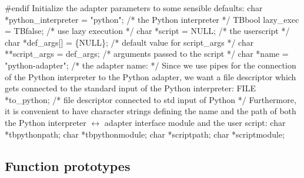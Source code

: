 #endif
\nwendcode{}\nwdocspar
Initialize the adapter parameters to some sensible defaults:
\nwenddocs{}\plusendmoddef\let\nwnotused=\nwoutput{}\nwstartdeflinemarkup{}\nwenddeflinemarkup
char *python_interpreter = "python";    /* the Python interpreter */
TBbool lazy_exec = TBfalse;             /* use lazy execution */
char *script = NULL;                    /* the userscript */
char *def_args[] = \{NULL\};              /* default value for script_args */
char **script_args = def_args;          /* arguments passed to the script */
char *name = "python-adapter";          /* the adapter name: */
\nwendcode{}\nwdocspar
Since we use pipes for the connection of the Python interpreter to the
Python adapter, we want a file descriptor which gets connected to the
standard input of the Python interpreter:
\nwenddocs{}\plusendmoddef\let\nwnotused=\nwoutput{}\nwstartdeflinemarkup{}\nwenddeflinemarkup
FILE *to_python;        /* file descriptor connected to std input of Python */
\nwendcode{}\nwdocspar
Furthermore, it is convenient to have character strings defining the name 
and the path of both the Python interpreter $\leftrightarrow$ adapter 
interface module and the user script:
\nwenddocs{}\plusendmoddef\let\nwnotused=\nwoutput{}\nwstartdeflinemarkup{}\nwenddeflinemarkup
char *tbpythonpath;
char *tbpythonmodule;
char *scriptpath;
char *scriptmodule;
\nwendcode{}\nwdocspar

\subsection{Function prototypes}

